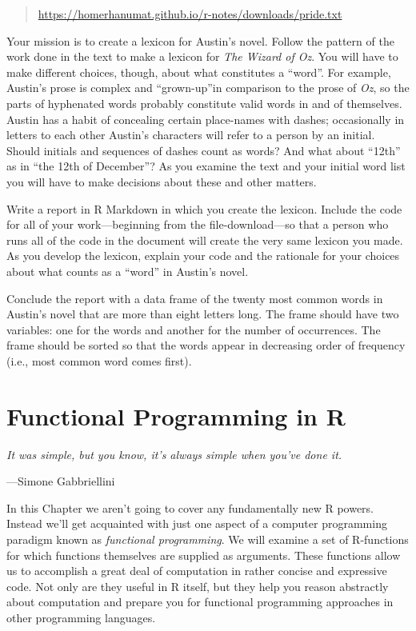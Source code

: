 \documentclass[]{book}
\theoremstyle{definition}
\theoremstyle{definition}
\theoremstyle{definition}
\theoremstyle{remark}
\let\BeginKnitrBlock\begin \let\EndKnitrBlock\end
\begin{document}
{\begin{enumerate}
  \begin{quote}
  \url{https://homerhanumat.github.io/r-notes/downloads/pride.txt}
  \end{quote}

  Your mission is to create a lexicon for Austin's novel. Follow the
  pattern of the work done in the text to make a lexicon for \emph{The
  Wizard of Oz}. You will have to make different choices, though, about
  what constitutes a ``word''. For example, Austin's prose is complex
  and ``grown-up''in comparison to the prose of \emph{Oz}, so the parts
  of hyphenated words probably constitute valid words in and of
  themselves. Austin has a habit of concealing certain place-names with
  dashes; occasionally in letters to each other Austin's characters will
  refer to a person by an initial. Should initials and sequences of
  dashes count as words? And what about ``12th'' as in ``the 12th of
  December''? As you examine the text and your initial word list you
  will have to make decisions about these and other matters.

  Write a report in R Markdown in which you create the lexicon. Include
  the code for all of your work---beginning from the file-download---so
  that a person who runs all of the code in the document will create the
  very same lexicon you made. As you develop the lexicon, explain your
  code and the rationale for your choices about what counts as a
  ``word'' in Austin's novel.

  Conclude the report with a data frame of the twenty most common words
  in Austin's novel that are more than eight letters long. The frame
  should have two variables: one for the words and another for the
  number of occurrences. The frame should be sorted so that the words
  appear in decreasing order of frequency (i.e., most common word comes
  first).
\end{enumerate}

\chapter{Functional Programming in R}\label{functional}

\BeginKnitrBlock{leadquote}
\emph{It was simple, but you know, it's always simple when you've done
it.}

---Simone Gabbriellini
\EndKnitrBlock{leadquote}

In this Chapter we aren't going to cover any fundamentally new R powers.
Instead we'll get acquainted with just one aspect of a computer
programming paradigm known as \emph{functional programming}. We will
examine a set of R-functions for which functions themselves are supplied
as arguments. These functions allow us to accomplish a great deal of
computation in rather concise and expressive code. Not only are they
useful in R itself, but they help you reason abstractly about
computation and prepare you for functional programming approaches in
other programming languages.

}
\end{document}
